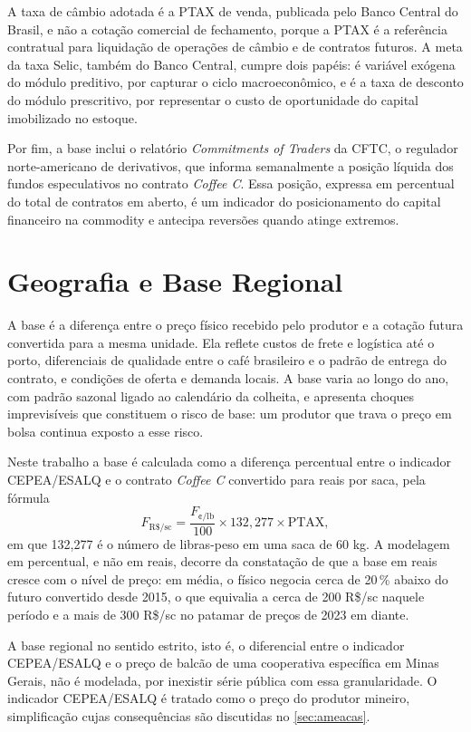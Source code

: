A taxa de câmbio adotada é a PTAX de venda, publicada pelo Banco Central do Brasil, e não a cotação comercial de fechamento, porque a PTAX é a referência contratual para liquidação de operações de câmbio e de contratos futuros. A meta da taxa Selic, também do Banco Central, cumpre dois papéis: é variável exógena do módulo preditivo, por capturar o ciclo macroeconômico, e é a taxa de desconto do módulo prescritivo, por representar o custo de oportunidade do capital imobilizado no estoque.

Por fim, a base inclui o relatório \textit{Commitments of Traders} da CFTC, o regulador norte-americano de derivativos, que informa semanalmente a posição líquida dos fundos especulativos no contrato \textit{Coffee C}. Essa posição, expressa em percentual do total de contratos em aberto, é um indicador do posicionamento do capital financeiro na commodity e antecipa reversões quando atinge extremos.

\section{Geografia e Base Regional}\label{sec2:fontes-base}

A base é a diferença entre o preço físico recebido pelo produtor e a cotação futura convertida para a mesma unidade. Ela reflete custos de frete e logística até o porto, diferenciais de qualidade entre o café brasileiro e o padrão de entrega do contrato, e condições de oferta e demanda locais. A base varia ao longo do ano, com padrão sazonal ligado ao calendário da colheita, e apresenta choques imprevisíveis que constituem o risco de base: um produtor que trava o preço em bolsa continua exposto a esse risco.

Neste trabalho a base é calculada como a diferença percentual entre o indicador CEPEA/ESALQ e o contrato \textit{Coffee C} convertido para reais por saca, pela fórmula
\begin{equation}
	F_{\text{R\$/sc}} = \frac{F_{\text{¢/lb}}}{100} \times 132{,}277 \times \text{PTAX},
\end{equation}
em que 132,277 é o número de libras-peso em uma saca de 60 kg. A modelagem em percentual, e não em reais, decorre da constatação de que a base em reais cresce com o nível de preço: em média, o físico negocia cerca de 20\,\% abaixo do futuro convertido desde 2015, o que equivalia a cerca de 200 R\$/sc naquele período e a mais de 300 R\$/sc no patamar de preços de 2023 em diante.

A base regional no sentido estrito, isto é, o diferencial entre o indicador CEPEA/ESALQ e o preço de balcão de uma cooperativa específica em Minas Gerais, não é modelada, por inexistir série pública com essa granularidade. O indicador CEPEA/ESALQ é tratado como o preço do produtor mineiro, simplificação cujas consequências são discutidas no \autoref{sec:ameacas}.
